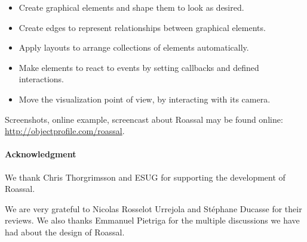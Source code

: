 \documentclass[a4paper,10pt,twoside]{book}
\begin{document}
\begin{itemize}
\item Create graphical elements and shape them to look as desired.
\item Create edges to represent relationships between graphical elements.
\item Apply layouts to arrange collections of elements automatically.
\item Make elements to react to events by setting callbacks and defined interactions.
\item Move the visualization point of view, by interacting with its camera.
\end{itemize}

Screenshots, online example, screencast about Roassal may be found online: \url{http://objectprofile.com/roassal}.

\paragraph{Acknowledgment}
We thank Chris Thorgrimsson and ESUG for supporting the development of Roassal.

We are very grateful to Nicolas Rosselot Urrejola and St\'ephane Ducasse for their reviews. We also thanks Emmanuel Pietriga for the multiple discussions we have had about the design of Roassal. 

%
%


\ifx\wholebook\relax\else
   
   
\end{document}
